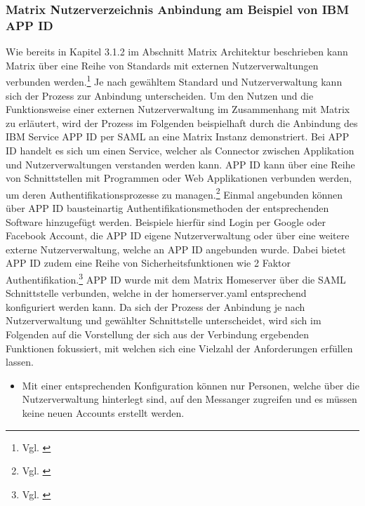 \subsubsection{Matrix Nutzerverzeichnis Anbindung am Beispiel von IBM APP ID}\label{chapter:vdmf}
Wie bereits in Kapitel 3.1.2 im Abschnitt \glqq Matrix Architektur\grqq{} beschrieben kann Matrix über eine Reihe von Standards mit externen Nutzerverwaltungen verbunden werden.\footnote{Vgl. \cite{Matirx.org-specifications2020}}
Je nach gewähltem Standard und Nutzerverwaltung kann sich der Prozess zur Anbindung unterscheiden. Um den Nutzen und die Funktionsweise einer externen Nutzerverwaltung im Zusammenhang mit Matrix zu erläutert, wird der Prozess im Folgenden beispielhaft durch die Anbindung des IBM Service APP ID per SAML an eine Matrix Instanz demonstriert. Bei APP ID handelt es sich um einen Service, welcher als Connector zwischen Applikation und Nutzerverwaltungen verstanden werden kann. APP ID kann über eine Reihe von Schnittstellen mit Programmen oder Web Applikationen verbunden werden, um deren Authentifikationsprozesse zu managen.\footnote{Vgl. \cite{IBM2020}} Einmal angebunden können über APP ID bausteinartig Authentifikationsmethoden der entsprechenden Software hinzugefügt werden. Beispiele hierfür sind Login per Google oder Facebook Account, die APP ID eigene Nutzerverwaltung oder über eine weitere externe Nutzerverwaltung, welche an APP ID angebunden wurde. Dabei bietet APP ID zudem eine Reihe von Sicherheitsfunktionen wie 2 Faktor Authentifikation.\footnote{Vgl. \cite{IBM2020}}
APP ID wurde mit dem Matrix Homeserver über die SAML Schnittstelle verbunden, welche in der homerserver.yaml entsprechend konfiguriert werden kann. Da sich der Prozess der Anbindung je nach Nutzerverwaltung und gewählter Schnittstelle unterscheidet, wird sich im Folgenden auf die Vorstellung der sich aus der Verbindung ergebenden Funktionen fokussiert, mit welchen sich eine Vielzahl der Anforderungen erfüllen lassen.

\begin{itemize}
    \item Mit einer entsprechenden Konfiguration können nur Personen, welche über die Nutzerverwaltung hinterlegt sind, auf den Messanger zugreifen und es müssen keine neuen Accounts erstellt werden.
\end{itemize}

